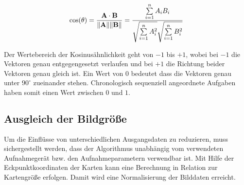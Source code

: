 \begin{equation}
\label{eq:cosinesimilarity}
\cos(\theta) = {\mathbf{A} \cdot \mathbf{B} \over \|\mathbf{A}\| \|\mathbf{B}\|} = \frac{ \sum\limits_{i=1}^{n}{A_i  B_i} }{ \sqrt{\sum\limits_{i=1}^{n}{A_i^2}}  \sqrt{\sum\limits_{i=1}^{n}{B_i^2}} }
\end{equation}

Der Wertebereich der Kosinusähnlichkeit geht von $-1$ bis $+1$, wobei bei $-1$ die Vektoren genau entgegengesetzt verlaufen und bei $+1$ die Richtung beider Vektoren genau gleich ist. Ein Wert von $0$ bedeutet dass die Vektoren genau unter $90^{\circ}$ zueinander stehen. Chronologisch sequenziell angeordnete Aufgaben haben somit einen Wert zwischen $0$ und $1$.
\subsection{Ausgleich der Bildgröße}
\label{sub:grunddaten}
Um die Einflüsse von unterschiedlichen Ausgangsdaten zu reduzieren, muss sichergestellt werden, dass der Algorithmus unabhängig vom verwendeten Aufnahmegerät bzw. den Aufnahmeparametern verwendbar ist.
Mit Hilfe der Eckpunktkoordinaten der Karten kann eine Berechnung in Relation zur Kartengröße erfolgen. Damit wird eine Normalisierung der Bilddaten erreicht. 


